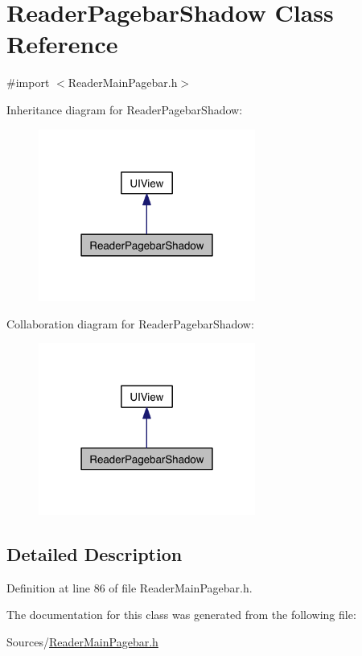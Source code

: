 \hypertarget{interface_reader_pagebar_shadow}{\section{Reader\-Pagebar\-Shadow Class Reference}
\label{db/d3e/interface_reader_pagebar_shadow}
}


{\ttfamily \#import $<$Reader\-Main\-Pagebar.\-h$>$}



Inheritance diagram for Reader\-Pagebar\-Shadow\-:
\nopagebreak
\begin{figure}[H]
\begin{center}
\leavevmode
\includegraphics[width=202pt]{d0/d2c/interface_reader_pagebar_shadow__inherit__graph}
\end{center}
\end{figure}


Collaboration diagram for Reader\-Pagebar\-Shadow\-:
\nopagebreak
\begin{figure}[H]
\begin{center}
\leavevmode
\includegraphics[width=202pt]{d0/d0d/interface_reader_pagebar_shadow__coll__graph}
\end{center}
\end{figure}


\subsection{Detailed Description}


Definition at line 86 of file Reader\-Main\-Pagebar.\-h.



The documentation for this class was generated from the following file\-:\begin{DoxyCompactItemize}
\item 
Sources/\hyperlink{_reader_main_pagebar_8h}{Reader\-Main\-Pagebar.\-h}\end{DoxyCompactItemize}
